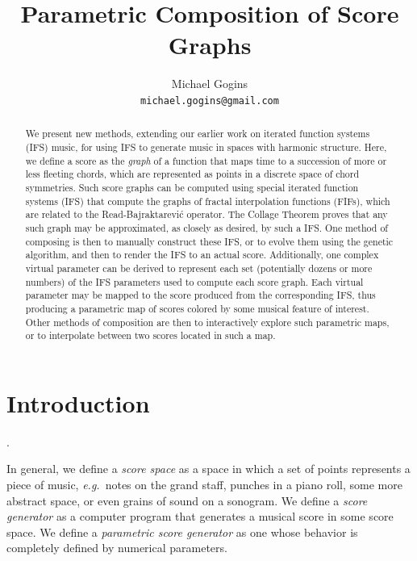 \documentclass[english,11pt,letterpaper,onecolumn]{scrartcl}
\numberwithin{equation}{section}
\begin{document}
\title{Parametric Composition of Score Graphs}
\author{Michael Gogins \\ \texttt{michael.gogins@gmail.com}}
\maketitle

\begin{abstract}
We present new methods, extending our earlier work on iterated function systems
(IFS) music, for using IFS to generate music in spaces with harmonic structure.
Here, we define a score as the \textit{graph} of a function that maps time to a
succession of more or less fleeting chords, which are represented as points in a
discrete space of chord symmetries. Such score graphs can be computed using
special iterated function systems (IFS) that compute the graphs of fractal
interpolation functions (FIFs), which are related to the Read-Bajraktarevi\'c
operator. The Collage Theorem proves that any such graph may be approximated, as
closely as desired, by such a IFS. One method of composing is then to manually
construct these IFS, or to evolve them using the genetic algorithm, and then to
render the IFS to an actual score. Additionally, one complex virtual parameter
can be derived to represent each set (potentially dozens or more numbers) of the
IFS parameters used to compute each score graph. Each virtual parameter may be
mapped to the score produced from the corresponding IFS, thus producing a
parametric map of scores colored by some musical feature of interest. Other
methods of composition are then to interactively explore such parametric maps,
or to interpolate between two scores located in such a map.
\end{abstract}




\section{Introduction}

.

In general, we define a \textit{score space} as a space in which a set of points
represents a piece of music, \textit{e.g.}\ notes on the grand staff, punches in
a piano roll, some more abstract space, or even grains of sound on a sonogram.
We define a \textit{score generator} as a computer program that generates a
musical score in some score space. We define a \textit{parametric score
generator} as one whose behavior is completely defined by numerical parameters.
\end{document}
